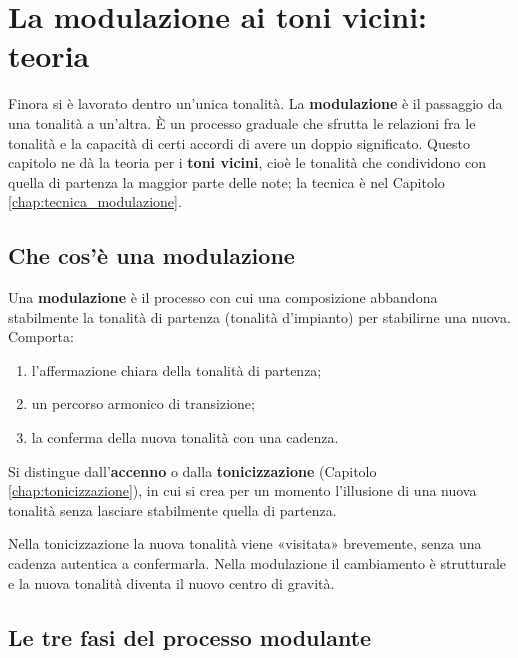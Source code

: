\chapter{La modulazione ai toni vicini: teoria}
\label{chap:modulazione}

Finora si è lavorato dentro un'unica tonalità. La \textbf{modulazione} è il passaggio da una tonalità a un'altra. È un processo graduale che sfrutta le relazioni fra le tonalità e la capacità di certi accordi di avere un doppio significato. Questo capitolo ne dà la teoria per i \textbf{toni vicini}, cioè le tonalità che condividono con quella di partenza la maggior parte delle note; la tecnica è nel Capitolo \ref{chap:tecnica_modulazione}.

\section{Che cos'è una modulazione}
\label{sec:definizione_modulazione}

\begin{definizione}[Modulazione]
	\label{def:modulazione}
	Una \textbf{modulazione} è il processo con cui una composizione abbandona stabilmente la tonalità di partenza (tonalità d'impianto) per stabilirne una nuova. Comporta:
	\begin{enumerate}
		\item l'affermazione chiara della tonalità di partenza;
		\item un percorso armonico di transizione;
		\item la conferma della nuova tonalità con una cadenza.
	\end{enumerate}
	Si distingue dall'\textbf{accenno} o dalla \textbf{tonicizzazione} (Capitolo \ref{chap:tonicizzazione}), in cui si crea per un momento l'illusione di una nuova tonalità senza lasciare stabilmente quella di partenza.
\end{definizione}

Nella tonicizzazione la nuova tonalità viene «visitata» brevemente, senza una cadenza autentica a confermarla. Nella modulazione il cambiamento è strutturale e la nuova tonalità diventa il nuovo centro di gravità.

\section{Le tre fasi del processo modulante}
\label{sec:fasi_modulazione}

